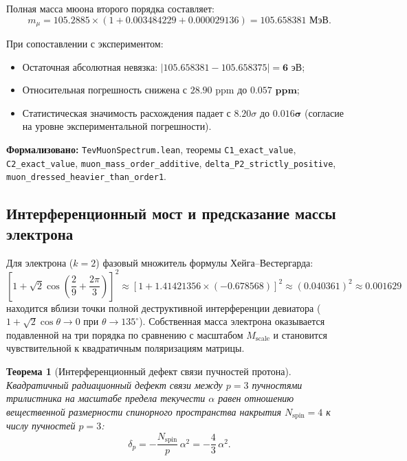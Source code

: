 \documentclass[11pt,a4paper]{article}
\newtheorem{theorem}{Теорема}
\theoremstyle{definition}
\theoremstyle{remark}
\begin{document}
Полная масса мюона второго порядка составляет:
\begin{equation}
m_\mu = 105.2885 \times \left(1 + 0.003484229 + 0.000029136\right) = \mathbf{105.658381 \text{ МэВ}}.
\end{equation}

При сопоставлении с экспериментом:
\begin{itemize}
    \item Остаточная абсолютная невязка: $|105.658381 - 105.658375| = \mathbf{6\text{ эВ}}$;
    \item Относительная погрешность снижена с $28.90\text{ ppm}$ до $\mathbf{0.057\text{ ppm}}$;
    \item Статистическая значимость расхождения падает с $8.20\sigma$ до $\mathbf{0.016\sigma}$ (согласие на уровне экспериментальной погрешности).
\end{itemize}

\noindent\small\textbf{Формализовано:} \texttt{TevMuonSpectrum.lean}, теоремы \texttt{C1\_exact\_value}, \texttt{C2\_exact\_value}, \texttt{muon\_mass\_order\_additive}, \texttt{delta\_P2\_strictly\_positive}, \texttt{muon\_dressed\_heavier\_than\_order1}.

\subsection{Интерференционный мост и предсказание массы электрона}

Для электрона ($k=2$) фазовый множитель формулы Хейга--Вестергарда:
\begin{equation}
	\left[ 1 + \sqrt{2}\cos\left(\frac{2}{9} + \frac{2\pi}{3}\right) \right]^2 \approx \left[ 1 + 1.41421356 \times (-0.678568) \right]^2 \approx (0.040361)^2 \approx 0.001629
\end{equation}
находится вблизи точки полной деструктивной интерференции девиатора ($1 + \sqrt{2}\cos\theta \to 0$ при $\theta \to 135^\circ$). Собственная масса электрона оказывается подавленной на три порядка по сравнению с масштабом $M_{\mathrm{scale}}$ и становится чувствительной к квадратичным поляризациям матрицы.
	
\begin{theorem}[Интерференционный дефект связи пучностей протона]
\label{thm:proton_interference_defect}
Квадратичный радиационный дефект связи между $p=3$ пучностями трилистника на масштабе предела текучести $\alpha$ равен отношению вещественной размерности спинорного пространства накрытия $N_{\mathrm{spin}} = 4$ к числу пучностей $p=3$:
\begin{equation}
	\delta_p = -\frac{N_{\mathrm{spin}}}{p} \, \alpha^2 = -\frac{4}{3} \, \alpha^2.
	\label{eq:defect_exact}
\end{equation}
\end{theorem}
\end{document}

